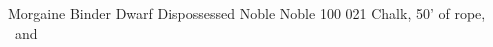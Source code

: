
\filledCS%
  {Morgaine Binder}%
  {Dwarf}%
  {Dispossessed Noble}%
  {Noble}%
  {{1}{0}{0}}%
  {{0}{2}{1}}%
  {%
    \renewcommand\rank{Fodder}
    \renewcommand\characterDebt{100 \glspl{sp}}
    \renewcommand\charSpells{
      \showSpells{Fate1}
      \showSpells{Fate1}
    }
    \shortsword
    \partialleather
    \setcounter{Academics}{1}
    \setcounter{Caving}{1}
    \setcounter{Empathy}{2}
    \setcounter{Vigilance}{2}
    \setcounter{Fate}{1}
  }%
  {}%
  {Chalk, 50' of rope, \rations\ and \rations}%


